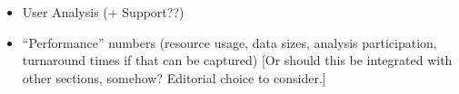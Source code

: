 \begin{itemize}

\item User Analysis (+ Support??)






\item ``Performance'' numbers (resource usage, data sizes, analysis participation, turnaround times if that can be captured) [Or should this be integrated with other sections, somehow?  Editorial choice to consider.]



\end{itemize}


